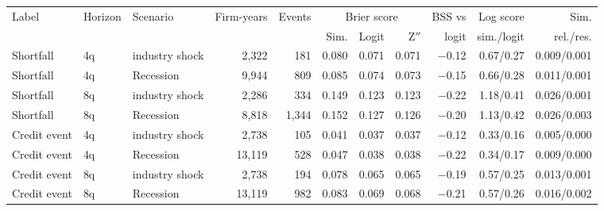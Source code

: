 \begin{tabular}{lllrrrrrrrr}
\toprule
Label & Horizon & Scenario & Firm-years & Events & \multicolumn{3}{c}{Brier score} & BSS vs & Log score & Sim. \\
\cmidrule(lr){6-8}
 & & & & & Sim. & Logit & Z$''$ & logit & sim./logit & rel./res. \\
\midrule
Shortfall & 4q & industry shock & 2{,}322 & 181 & 0.080 & 0.071 & 0.071 & $-$0.12 & 0.67/0.27 & 0.009/0.001 \\
Shortfall & 4q & Recession & 9{,}944 & 809 & 0.085 & 0.074 & 0.073 & $-$0.15 & 0.66/0.28 & 0.011/0.001 \\
Shortfall & 8q & industry shock & 2{,}286 & 334 & 0.149 & 0.123 & 0.123 & $-$0.22 & 1.18/0.41 & 0.026/0.001 \\
Shortfall & 8q & Recession & 8{,}818 & 1{,}344 & 0.152 & 0.127 & 0.126 & $-$0.20 & 1.13/0.42 & 0.026/0.003 \\
Credit event & 4q & industry shock & 2{,}738 & 105 & 0.041 & 0.037 & 0.037 & $-$0.12 & 0.33/0.16 & 0.005/0.000 \\
Credit event & 4q & Recession & 13{,}119 & 528 & 0.047 & 0.038 & 0.038 & $-$0.22 & 0.34/0.17 & 0.009/0.000 \\
Credit event & 8q & industry shock & 2{,}738 & 194 & 0.078 & 0.065 & 0.065 & $-$0.19 & 0.57/0.25 & 0.013/0.001 \\
Credit event & 8q & Recession & 13{,}119 & 982 & 0.083 & 0.069 & 0.068 & $-$0.21 & 0.57/0.26 & 0.016/0.002 \\
\bottomrule
\end{tabular}
